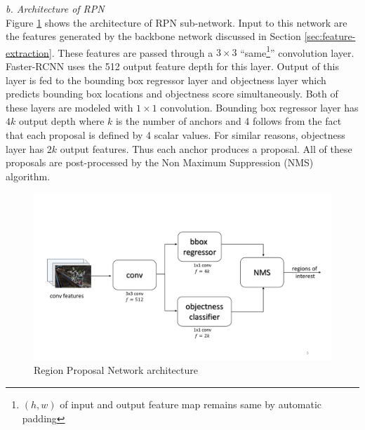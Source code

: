 \vspace{5pt}
\textit{b. Architecture of RPN}\\
Figure \ref{fig:RPN-architecture} shows the architecture of RPN sub-network. Input to this network are the features generated by the backbone network discussed in Section \ref{sec:feature-extraction}. These features are passed through a $3\times3$ ``same\footnote{$(h,w)$ of input and output feature map remains same by automatic padding}'' convolution layer. Faster-RCNN uses the 512 output feature depth for this layer. Output of this layer is fed to the bounding box regressor layer and objectness layer which predicts bounding box locations and objectness score simultaneously.
Both of these layers are modeled with $1\times1$ convolution. Bounding box regressor layer has $4k$ output depth where $k$ is the number of anchors and 4 follows from the fact that each proposal is defined by 4 scalar values. For similar reasons, objectness layer has $2k$ output features. Thus each anchor produces a proposal. All of these proposals are post-processed by the Non Maximum Suppression (NMS) algorithm. 


\begin{figure}
    \centering
    \includegraphics[width=\linewidth,trim={0 70 0 110},clip]{images/RPN-architecture}
    \caption[RPN architecture]{Region Proposal Network architecture}
    \label{fig:RPN-architecture}
\end{figure}


\vspace{5pt}
